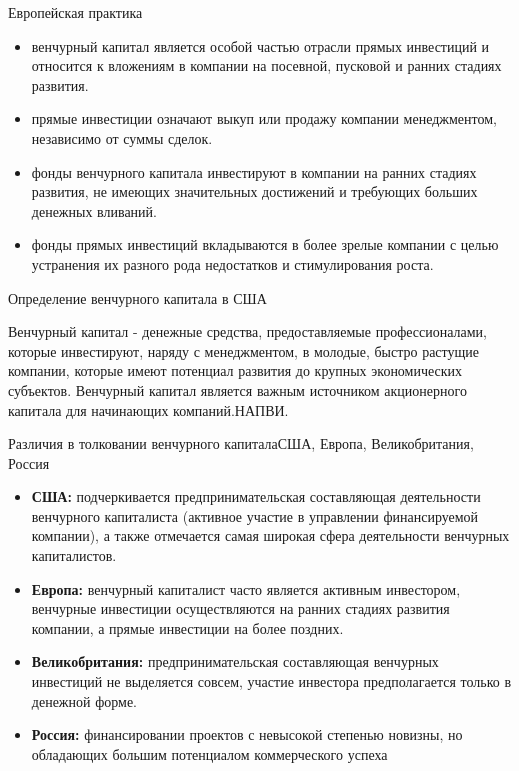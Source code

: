 \documentclass[_Venture_p1.tex]{subfiles}
\begin{document}
\begin{frame}[allowframebreaks]{Европейская практика}
\begin{itemize}
	\item венчурный капитал является особой частью отрасли прямых инвестиций и относится к вложениям в компании на посевной, пусковой и ранних стадиях развития. 
	\item прямые инвестиции означают выкуп или продажу компании менеджментом, независимо от суммы сделок. 
	
	\pagebreak
	\item фонды венчурного капитала инвестируют в компании на ранних стадиях развития, не имеющих значительных достижений и требующих больших денежных вливаний.  
	\item фонды прямых инвестиций вкладываются в более зрелые компании с целью устранения их разного рода недостатков и стимулирования роста.
\end{itemize}
\end{frame}

\begin{frame}{Определение венчурного капитала в США}
\begin{block}{Венчурный капитал }
	\quad
	- денежные средства, предоставляемые профессионалами, которые инвестируют, наряду с менеджментом, в молодые, быстро растущие компании, которые имеют потенциал развития до крупных экономических субъектов. Венчурный капитал является важным источником акционерного капитала для начинающих компаний.НАПВИ.
\end{block}
\end{frame}

\begin{frame}[allowframebreaks]{Различия в толковании венчурного капитала}{США, Европа, Великобритания, Россия}
\begin{itemize}
	\small
	\item \textbf{США:} подчеркивается предпринимательская составляющая деятельности венчурного капиталиста (активное участие в управлении финансируемой компании), а также отмечается самая широкая сфера деятельности венчурных капиталистов. 
	\item \textbf{Европа: }венчурный капиталист часто является активным инвестором, венчурные инвестиции осуществляются на ранних стадиях развития компании, а прямые инвестиции на более поздних. 
	
	\pagebreak
	\item \textbf{Великобритания: }предпринимательская составляющая венчурных инвестиций не выделяется совсем, участие инвестора предполагается только в денежной форме.
	\item \textbf{Россия:} финансировании проектов с невысокой степенью новизны, но обладающих большим потенциалом коммерческого успеха
\end{itemize}
\end{frame}
\end{document}
